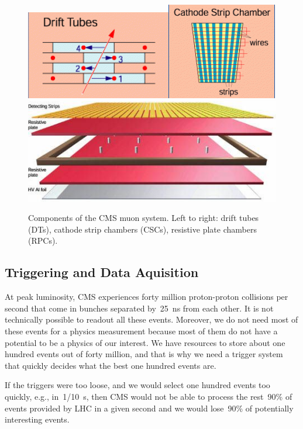 \begin{figure}[htb]
  \begin{center}
    \includegraphics[height=2.5 cm]{../figs/Exp/muonSystem_driftTubes.png}\quad\includegraphics[height=2.5 cm]{../figs/Exp/muonSystem_CSC.png}\quad\includegraphics[height=2.5 cm]{../figs/Exp/muonSystem_RPC.png}
    \caption{Components of the CMS muon system. Left to right: drift tubes (DTs), cathode strip chambers (CSCs), resistive plate chambers (RPCs).}
    \label{fig:muonSystem}
  \end{center}
\end{figure}


\subsection{Triggering and Data Aquisition}

At peak luminosity, CMS experiences forty million proton-proton collisions per second that come in bunches separated by~25~ns from each other. It is not technically possible to readout all these events. Moreover, we do not need most of these events for a physics measurement because most of them do not have a potential to be a physics of our interest. We have resources to store about one hundred events out of forty million, and that is why we need a trigger system that quickly decides what the best one hundred events are.


If the triggers were too loose, and we would select one hundred events too quickly, e.g., in~1/10~s, then CMS would not be able to process the rest~90\% of events provided by LHC in a given second and we would lose~90\% of potentially interesting events.

